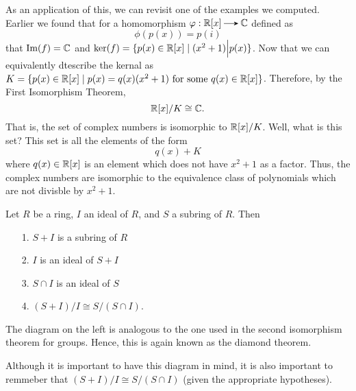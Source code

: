     As an application of this, we can revisit one of the examples
    we computed. Earlier we found that for a homomorphism $\phi:
    \RR[x] \to \mathbb{C}$ defined as 
    \[
        \phi(p(x)) = p(i)
    \]
    that $\mbox{Im}(f) = \mathbb{C}$ and $\ker(f) = \{p(x) \in \mathbb{R}[x]
    \mid (x^2 + 1)\Big|p(x) \}$. Now that we can equivalently
    dtescribe the kernal as $K = \{p(x) \in \mathbb{R}[x] \mid p(x) =
    q(x)(x^2 + 1) \text{ for some } q(x) \in \mathbb{R}[x]\}$. Therefore,
    by the First Isomorphism Theorem,
    \[
        \mathbb{R}[x]/K \cong \mathbb{C}.
    \]
    That is, the set of complex numbers is isomorphic to
    $\mathbb{R}[x]/K$. Well, what is this set? This set is all the
    elements of the form 
    \[
        q(x) + K 
    \] 
    where $q(x) \in \mathbb{R}[x]$ is an element which does not have $x^2
    + 1$ as a factor. Thus, the complex numbers are isomorphic to
    the equivalence class of polynomials which are not divisble by
    $x^2 + 1$.

    \begin{thm}
        Let $R$ be a ring, $I$ an ideal of $R$, and $S$ a subring
        of $R$. Then 
        \begin{itemize}
            \item[1.] $S + I$ is a subring of $R$ 
            \item[2.] $I$ is an ideal of $S + I$
            \item[3.] $S \cap I$ is an ideal of $S$
            \item[4.] $(S + I)/I \cong S/(S \cap I)$.
        \end{itemize}
    \end{thm}

    \begin{minipage}{0.25 \textwidth}
        \begin{figure}[H]
        \end{figure}
    \end{minipage} \hfill
    \begin{minipage}{0.7\textwidth}
        The diagram on the left is analogous to the one used in
        the second isomorphism theorem for groups. Hence, this is
        again known as the diamond theorem. 
        
        Although it is
        important to have this diagram in mind, it is also
        important to remmeber that $(S + I)/I \cong S/(S\cap I)$
        (given the appropriate hypotheses).
    \end{minipage}  

